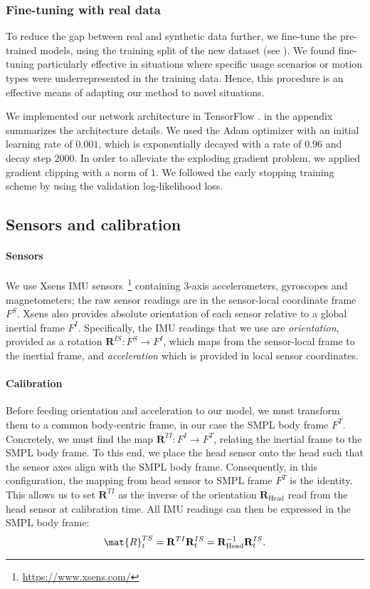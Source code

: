 \documentclass[acmtog]{acmart}
\begin{document}
\subsubsection{Fine-tuning with real data} 
To reduce the gap between real and synthetic data further, we fine-tune the pre-trained models, using the training split of the new dataset (see ). We found fine-tuning particularly effective in situations where specific usage scenarios or motion types were underrepresented in the training data. Hence, this procedure is an effective means of adapting our method to novel situations. 

We implemented our network architecture in TensorFlow \cite{tensorflow2015-whitepaper}.  in the appendix summarizes the architecture details. We used the Adam optimizer \cite{kingma2014adam} with an initial learning rate of $0.001$, which is exponentially decayed with a rate of $0.96$ and decay step $2000$. In order to alleviate the exploding gradient problem, we applied gradient clipping with a norm of $1$. We followed the early stopping training scheme by using the validation log-likelihood loss.

\subsection{Sensors and calibration}\label{sec:calibration}\paragraph{Sensors} We use Xsens IMU sensors~\footnote{\url{https://www.xsens.com/}} containing 3-axis accelerometers, gyroscopes and magnetometers; the raw sensor readings are in the sensor-local coordinate frame $F^S$. Xsens also  provides absolute orientation of each sensor relative to a global inertial frame $F^I$. Specifically, the IMU readings that we use are \emph{orientation}, provided as a rotation $\mathbf{R}^{IS} : F^S \rightarrow F^I$, which maps from the sensor-local frame to the inertial frame, and \emph{acceleration} which is provided in local sensor coordinates.

\paragraph{Calibration} Before feeding orientation and acceleration to our model, we must transform them to a common body-centric frame, in our case the SMPL body frame $F^T$. Concretely, we must find the map $\mathbf{R}^{TI} : F^I \rightarrow F^T$, relating the inertial frame to the SMPL body frame. To this end, we place the head sensor onto the head such that the sensor axes align with the SMPL body frame.  Consequently, in this configuration, the mapping from  head sensor to SMPL frame $F^T$ is the identity.
This allows us to set $\mathbf{R}^{TI}$  as the inverse of the orientation $\mathbf{R}_\mathrm{Head}$ read from the head sensor at calibration time. All IMU readings can then be expressed in the SMPL body frame:
\begin{equation}
\mat{R}^{TS}_t = \mathbf{R}^{TI}\mathbf{R}^{IS}_t = \mathbf{R}^{-1}_\mathrm{Head} \mathbf{R}^{IS}_t  .
\end{equation}
\end{document}
